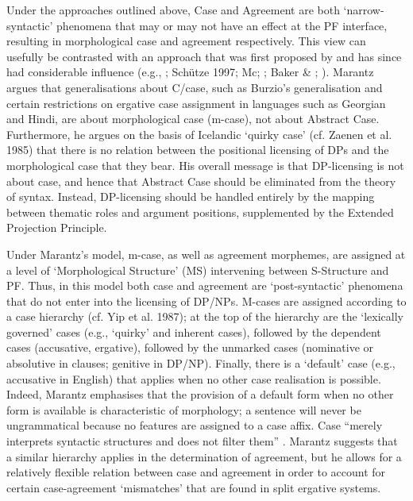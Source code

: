 \documentclass[output=paper]{langsci/langscibook}
\begin{document}
Under the approaches outlined above, Case and Agreement are both ‘narrow-syntactic’ phenomena that may or may not have an effect at the PF interface, resulting in morphological case and agreement respectively. This view can usefully be contrasted with an approach that was first proposed by \citet{Marantz1991} and has since had considerable influence (e.g., \citealt{Harley1995}; Schütze 1997; Mc\citealt{Fadden2004}; \citealt{Bobaljik2008}; Baker \& \citealt{Vinokurova2010}; \citealt{Titov2012}). Marantz argues that generalisations about C/case, such as Burzio’s generalisation \citep{Burzio1986} and certain restrictions on ergative case assignment in languages such as Georgian and Hindi, are about morphological case (m-case), not about Abstract Case. Furthermore, he argues on the basis of Icelandic ‘quirky case’ (cf. Zaenen et al. 1985) that there is no relation between the positional licensing of DPs and the morphological case that they bear. His overall message is that DP-licensing is not about case, and hence that Abstract Case should be eliminated from the theory of syntax. Instead, DP-licensing should be handled entirely by the mapping between thematic roles and argument positions, supplemented by the Extended Projection Principle.

Under Marantz’s model, m-case, as well as agreement morphemes, are assigned at a level of ‘Morphological Structure’ (MS) intervening between S-Structure and PF. Thus, in this model both case and agreement are ‘post-syntactic’ phenomena that do not enter into the licensing of DP/NPs. M-cases are assigned according to a case hierarchy (cf. Yip et al. 1987); at the top of the hierarchy are the ‘lexically governed’ cases (e.g., ‘quirky’ and inherent cases), followed by the dependent cases (accusative, ergative), followed by the unmarked cases (nominative or absolutive in clauses; genitive in DP/NP). Finally, there is a ‘default’ case (e.g., accusative in English) that applies when no other case realisation is possible. Indeed, Marantz emphasises that the provision of a default form when no other form is available is characteristic of morphology; a sentence will never be ungrammatical because no features are assigned to a case affix. Case “merely interprets syntactic structures and does not filter them” \citep[24]{Marantz1991}. Marantz suggests that a similar hierarchy applies in the determination of agreement, but he allows for a relatively flexible relation between case and agreement in order to account for certain case-agreement ‘mismatches’ that are found in split ergative systems.
\end{document}
